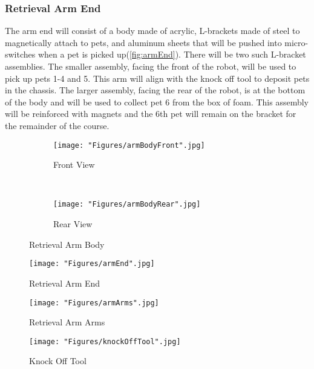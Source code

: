 \documentclass[11pt, oneside]{article} %
\begin{document}
		\subsubsection{Retrieval Arm End}
		The arm end will consist of a body made of acrylic, L-brackets made of steel to magnetically attach to pets, and aluminum sheets that will be pushed into micro-switches when a pet is picked up(\autoref{fig:armEnd}). There will be two such L-bracket assemblies. The smaller assembly, facing the front of the robot, will be used to pick up pets 1-4 and 5. This arm will align with the knock off tool to deposit pets in the chassis. The larger assembly, facing the rear of the robot, is at the bottom of the body and will be used to collect pet 6 from the box of foam. This assembly will be reinforced with magnets and the 6th pet will remain on the bracket for the remainder of the course.
		
	\begin{figure}[h]
		\centering
		\begin{subfigure}[b]{0.4\textwidth}
			\centering
			\texttt{[image: "Figures/armBodyFront".jpg]}
			\caption{Front View}
		\end{subfigure}
		~
		\begin{subfigure}[b]{0.5\textwidth}
			\centering
			\texttt{[image: "Figures/armBodyRear".jpg]}
			\caption{Rear View}
		\end{subfigure}
		\caption[Retrieval Arm Body]{Retrieval Arm Body}
		\label{fig:armBody}
	\end{figure}
		
	\begin{figure}[h]
		\centering
		\begin{minipage}[t]{.5\textwidth}
			\centering
			\texttt{[image: "Figures/armEnd".jpg]}
			\caption[Retrieval Arm End]{Retrieval Arm End}
			\label{fig:armEnd}
		\end{minipage}%
		\begin{minipage}[t]{.5\textwidth}
			\centering
			\texttt{[image: "Figures/armArms".jpg]}
			\caption[Retrieval Arm Arms]{Retrieval Arm Arms}
			\label{fig:arm}
		\end{minipage}
	\end{figure}
	
	\begin{figure}[!h]
		\centering
		\texttt{[image: "Figures/knockOffTool".jpg]}
		\caption[Knock Off Tool]{Knock Off Tool}
		\label{fig:knockOffTool}
	\end{figure}
	
\end{document}
